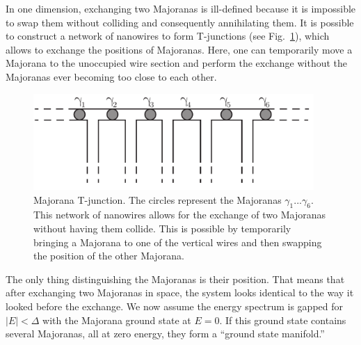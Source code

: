 In one dimension, exchanging two Majoranas is ill-defined because it is impossible to swap them without colliding and consequently annihilating them.
It is possible to construct a network of nanowires to form T-junctions (see Fig.~\ref{fig:Majorana-T-junction}), which allows to exchange the positions of Majoranas.
Here, one can temporarily move a Majorana to the unoccupied wire section and perform the exchange without the Majoranas ever becoming too close to each other.
\begin{figure}
\begin{center}
\includegraphics[width=0.95\textwidth]{chapter_introduction/figures/T-junction-network.pdf}
\centering{}
\caption{Majorana T-junction.
The circles represent the Majoranas $\gamma_{1}...\gamma_{6}$.
This network of nanowires allows for the exchange of two Majoranas without having them collide.
This is possible by temporarily bringing a Majorana to one of the vertical wires and then swapping the position of the other Majorana.
\label{fig:Majorana-T-junction}}
\end{center}
\end{figure}
The only thing distinguishing the Majoranas is their position.
That means that after exchanging two Majoranas in space, the system looks identical to the way it looked before the exchange.
We now assume the energy spectrum is gapped for $|E|<\Delta$ with the Majorana ground state at $E=0$.
If this ground state contains several Majoranas, all at zero energy, they form a ``ground state manifold.''

